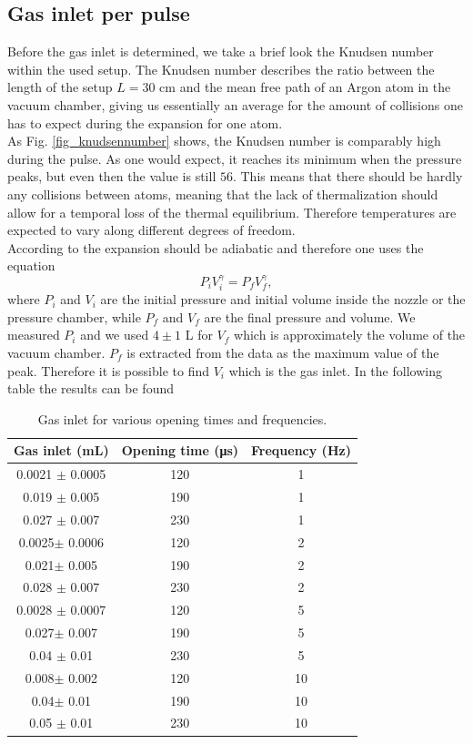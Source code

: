 \documentclass[a4paper,10pt]{article}
\begin{document}
\subsection{Gas inlet per pulse}
Before the gas inlet is determined, we take a brief look the Knudsen number within the used setup. The Knudsen number describes the ratio between the length of the setup $L = 30$ cm and the mean free path of an Argon atom in the vacuum chamber, giving us essentially an average for the amount of collisions one has to expect during the expansion for one atom. 
\\
As Fig. \ref{fig_knudsennumber} shows, the Knudsen number is comparably high during the pulse. As one would expect, it reaches its minimum when the pressure peaks, but even then the value is still $56$. This means that there should be hardly any collisions between atoms, meaning that the lack of thermalization should allow for a temporal loss of the thermal equilibrium. Therefore temperatures are expected to vary along different degrees of freedom. 
\\
According to \cite{illinois} the expansion should be adiabatic and therefore one uses the equation 
\begin{equation}
	P_i V_i^\gamma = P_f V_f^\gamma,
\end{equation}
where $P_i$ and $V_i$ are the initial pressure and initial volume inside the nozzle or the pressure chamber, while $P_f$ and $V_f$ are the final pressure and volume. We measured $P_i$ and we used $4\pm 1$ L for $V_f$ which is approximately the volume of the vacuum chamber. $P_f$ is extracted from the data as the maximum value of the peak. Therefore it is possible to find $V_i$ which is the gas inlet. In the following table the results can be found
\begin{table}[H]
\centering
\begin{tabular}{ccc} \toprule
    Gas inlet (mL) & Opening time (\si{\micro \s}) & Frequency (\si{\hertz}) \\ \midrule
0.0021 $\pm$ 0.0005 & 120& 1 \\
0.019 $\pm$ 0.005& 190& 1\\
0.027 $\pm$ 0.007 & 230& 1\\\midrule
0.0025$\pm$ 0.0006& 120& 2\\
0.021$\pm$ 0.005& 190& 2\\
0.028 $\pm$ 0.007& 230& 2\\\midrule
0.0028 $\pm$ 0.0007& 120& 5\\
0.027$\pm$ 0.007 & 190& 5\\
0.04 $\pm$ 0.01 & 230& 5\\\midrule
0.008$\pm$ 0.002& 120& 10\\
0.04$\pm$ 0.01& 190& 10\\
0.05 $\pm$ 0.01& 230& 10\\\bottomrule
\end{tabular}
\caption{Gas inlet for various opening times and frequencies. }
\end{table}
\end{document}
